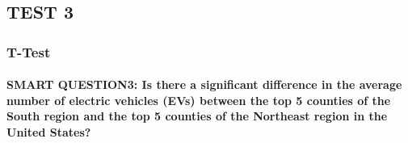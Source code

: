 \documentclass[
  letterpaper,
  DIV=11,
  numbers=noendperiod]{scrartcl}
\let\oldparagraph\paragraph
\renewcommand{\paragraph}[1]{\oldparagraph{#1}\mbox{}}
\begin{document}
\hypertarget{test-3}{%
\subsection{TEST 3}\label{test-3}}

\hypertarget{t-test}{%
\subsubsection{T-Test}\label{t-test}}

\hypertarget{smart-question3-is-there-a-significant-difference-in-the-average-number-of-electric-vehicles-evs-between-the-top-5-counties-of-the-south-region-and-the-top-5-counties-of-the-northeast-region-in-the-united-states}{%
\paragraph{SMART QUESTION3: Is there a significant difference in the
average number of electric vehicles (EVs) between the top 5 counties of
the South region and the top 5 counties of the Northeast region in the
United
States?}\label{smart-question3-is-there-a-significant-difference-in-the-average-number-of-electric-vehicles-evs-between-the-top-5-counties-of-the-south-region-and-the-top-5-counties-of-the-northeast-region-in-the-united-states}}
\end{document}
